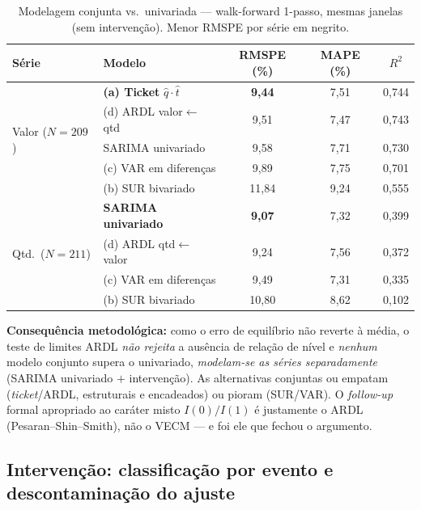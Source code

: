 \documentclass[11pt,a4paper]{article}
\begin{document}
\begin{table}[H]
\centering
\caption{Modelagem conjunta vs.\ univariada --- walk-forward 1-passo, mesmas janelas (sem
intervenção). Menor RMSPE por série em negrito.}
\label{tab:joint}
\small
\begin{tabular}{@{}llccc@{}}
\toprule
Série & Modelo & RMSPE (\%) & MAPE (\%) & $R^2$ \\
\midrule
\multirow{5}{*}{Valor ($N{=}209$)}
 & \textbf{(a) Ticket} $\hat q\cdot\hat t$ & \textbf{9,44}  & 7,51 & 0,744 \\
 & (d) ARDL valor$\leftarrow$qtd            & 9,51           & 7,47 & 0,743 \\
 & SARIMA univariado                        & 9,58           & 7,71 & 0,730 \\
 & (c) VAR em diferenças                    & 9,89           & 7,75 & 0,701 \\
 & (b) SUR bivariado                        & 11,84          & 9,24 & 0,555 \\
\midrule
\multirow{4}{*}{Qtd.\ ($N{=}211$)}
 & \textbf{SARIMA univariado}               & \textbf{9,07}  & 7,32 & 0,399 \\
 & (d) ARDL qtd$\leftarrow$valor            & 9,24           & 7,56 & 0,372 \\
 & (c) VAR em diferenças                    & 9,49           & 7,31 & 0,335 \\
 & (b) SUR bivariado                        & 10,80          & 8,62 & 0,102 \\
\bottomrule
\end{tabular}
\end{table}

\noindent\textbf{Consequência metodológica:} como o erro de equilíbrio não reverte à média, o teste
de limites ARDL \emph{não rejeita} a ausência de relação de nível e \emph{nenhum} modelo conjunto
supera o univariado, \emph{modelam-se as séries separadamente} (SARIMA univariado $+$ intervenção).
As alternativas conjuntas ou empatam (\emph{ticket}/ARDL, estruturais e encadeados) ou pioram
(SUR/VAR). O \emph{follow-up} formal apropriado ao caráter misto $I(0)/I(1)$ é justamente o ARDL
(Pesaran--Shin--Smith), não o VECM --- e foi ele que fechou o argumento.

\subsection{Intervenção: classificação por evento e descontaminação do ajuste}
\label{sec:res-interv}
\end{document}
